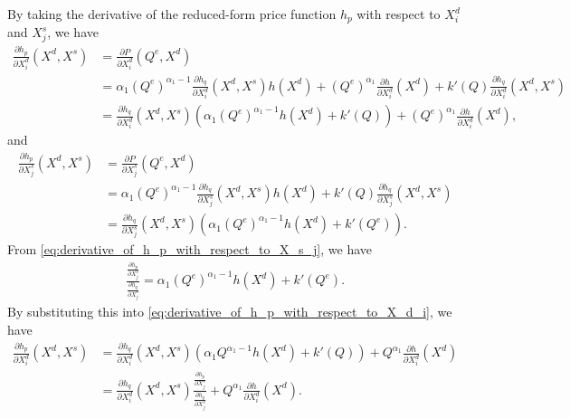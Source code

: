 \documentclass[11pt, a4paper]{article}
\theoremstyle{remark}
\begin{document}
By taking the derivative of the reduced-form price function $h_p$ with respect to $X^{d}_i$ and $X^{s}_j$, we have
\begin{align}
    \frac{\partial h_p}{\partial X^{d}_i}(X^{d}, X^{s}) & = \frac{\partial P}{\partial X^{d}_i}(Q^e, X^{d})\\
    &= \alpha_1 (Q^e)^{\alpha_1 - 1} \frac{\partial h_q}{\partial X^{d}_i}(X^{d}, X^{s})h(X^{d}) + (Q^e)^{\alpha_1} \frac{\partial h}{\partial X^{d}_i}(X^{d}) + k'(Q) \frac{\partial h_q}{\partial X^{d}_i}(X^{d}, X^{s})\\
    & = \frac{\partial h_q}{\partial X^{d}_i}(X^{d}, X^{s})\left(\alpha_1 (Q^e)^{\alpha_1 - 1}h(X^{d}) + k'(Q)\right) + (Q^e)^{\alpha_1} \frac{\partial h}{\partial X^{d}_i}(X^{d}), \label{eq:derivative_of_h_p_with_respect_to_X_d_i}
\end{align}
and
\begin{align}
    \frac{\partial h_p}{\partial X^{s}_j}(X^{d}, X^{s}) & = \frac{\partial P}{\partial X^{s}_j}(Q^e, X^{d})\\
    &= \alpha_1(Q^e)^{\alpha_1-1} \frac{\partial h_q}{\partial X^{s}_j}(X^{d}, X^{s})h(X^{d}) + k'(Q) \frac{\partial h_q}{\partial X^{s}_j}(X^{d}, X^{s})\\
    & = \frac{\partial h_q}{\partial X^{s}_j}(X^{d}, X^{s})\left(\alpha_1 (Q^e)^{\alpha_1 - 1}h(X^{d}) + k'(Q^e)\right). \label{eq:derivative_of_h_p_with_respect_to_X_s_j}
\end{align}
From \eqref{eq:derivative_of_h_p_with_respect_to_X_s_j}, we have
\begin{align}
    \frac{\frac{\partial h_p}{\partial X^{s}_j}}{\frac{\partial h_q}{\partial X^{s}_j}} = \alpha_1 (Q^e)^{\alpha_1 - 1}h(X^{d}) + k'(Q^e).
\end{align}
By substituting this into \eqref{eq:derivative_of_h_p_with_respect_to_X_d_i}, we have
\begin{align}
    \frac{\partial h_p}{\partial X^{d}_i}(X^{d}, X^{s}) & = \frac{\partial h_q}{\partial X^{d}_i}(X^{d}, X^{s})\left(\alpha_1 Q^{\alpha_1 - 1}h(X^{d}) + k'(Q)\right) + Q^{\alpha_1} \frac{\partial h}{\partial X^{d}_i}(X^{d})\\
    & = \frac{\partial h_q}{\partial X^{d}_i}(X^{d}, X^{s})\frac{\frac{\partial h_p}{\partial X^{s}_j}}{\frac{\partial h_q}{\partial X^{s}_j}} + Q^{\alpha_1} \frac{\partial h}{\partial X^{d}_i}(X^{d}).
\end{align}
\end{document}
